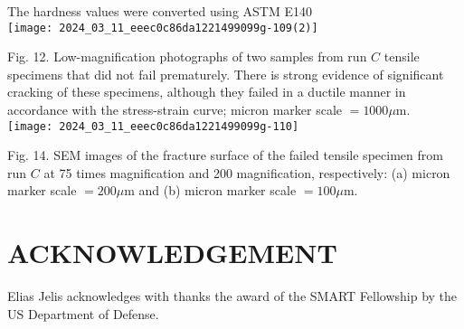 \documentclass[10pt]{article}
\begin{document}
The hardness values were converted using ASTM E140\\
\texttt{[image: 2024\_03\_11\_eeec0c86da1221499099g-109(2)]}

Fig. 12. Low-magnification photographs of two samples from run $C$ tensile specimens that did not fail prematurely. There is strong evidence of significant cracking of these specimens, although they failed in a ductile manner in accordance with the stress-strain curve; micron marker scale $=1000 \mu \mathrm{m}$.\\
\texttt{[image: 2024\_03\_11\_eeec0c86da1221499099g-110]}

Fig. 14. SEM images of the fracture surface of the failed tensile specimen from run $C$ at 75 times magnification and 200 magnification, respectively: (a) micron marker scale $=200 \mu \mathrm{m}$ and (b) micron marker scale $=100 \mu \mathrm{m}$.

\section*{ACKNOWLEDGEMENT}
Elias Jelis acknowledges with thanks the award of the SMART Fellowship by the US Department of Defense.
\end{document}
